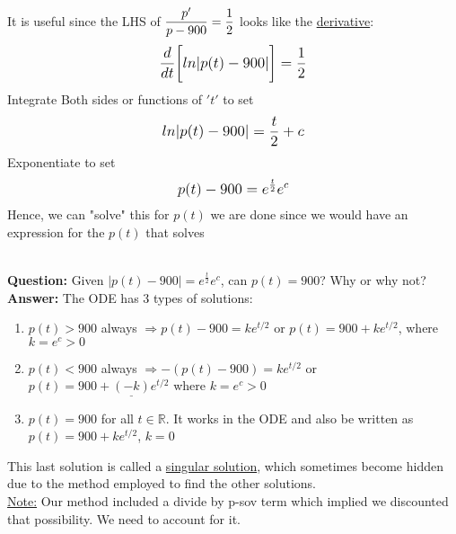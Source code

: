 \begin{enumerate}[label=\protect\circled{\arabic*}]
	It is useful since the LHS of $\mathlarger{\frac{p'}{p-900} = \frac{1}{2}}$ looks like the \underline{derivative}: 
	\begin{equation*}
		\mathlarger{\dfrac{d}{dt}\bigg[ln|p(t) - 900|\bigg] = \frac{1}{2}}
	\end{equation*}
	Integrate Both sides or functions of $'t'$ to set
	\begin{equation*}
		\mathlarger{ln|p(t) - 900| = \frac{t}{2} + c}
	\end{equation*}
	Exponentiate to set
	\begin{equation*}
		\mathlarger{p(t) - 900 = e^{\frac{t}{2}}e^c}
	\end{equation*}
	Hence, we can "solve" this for $p(t)$ we are done since we would have an expression for the $p(t)$ that solves 
\end{enumerate}
\redhline\\
\textbf{Question:} Given $|p(t) - 900| = e^{\frac{t}{2}}e^c$, can $p(t) = 900$? Why or why not?\\
\textbf{Answer:} The ODE  has 3 types of solutions:
\begin{enumerate}[label=\protect\circled{\arabic*}]
	\item $p(t) > 900$ always $\Rightarrow p(t) - 900 = ke^{t/2}$ or $ p(t) = 900 + ke^{t/2}$, where $k = e^c > 0$
	\item $p(t) < 900$ always $\Rightarrow -(p(t) - 900) = ke^{t/2}$ or $ p(t) = 900 + \underline{(-k)}e^{t/2}$ where $k = e^c > 0$
	\item $p(t) = 900$ for all $t \in \mathbb{R}$. It works in the ODE and  also be written as $p(t) = 900 + ke^{t/2}$, $k = 0$
\end{enumerate}
\begin{definition-N}
	This last solution is called a \underline{singular solution}, which sometimes become hidden due to the method employed to find the other solutions.\\
	\underline{Note:} Our method included a divide by p-sov term which implied we discounted that possibility. We need to account for it. 
\end{definition-N}

